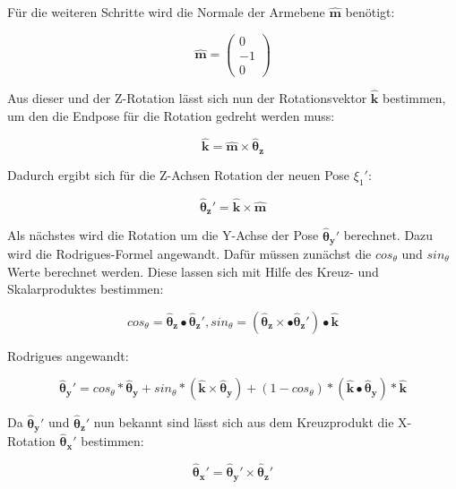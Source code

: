 Für die weiteren Schritte wird die Normale der Armebene $\pmb{\hat{m}}$ benötigt:

\begin{equation}
\pmb{\hat{m}} = 
\left(\begin{array}{c} 
0 \\
-1\\
0
\end{array}\right)
\label{eq:21}
\end{equation}

Aus dieser und der Z-Rotation lässt sich nun der Rotationsvektor $\pmb{\hat{k}}$ bestimmen, um den die Endpose für die Rotation gedreht werden muss:

\begin{equation}
\pmb{\hat{k}} = \pmb{\hat{m}} \times \pmb{\hat{\theta}_z} 
\label{eq:22}
\end{equation}

Dadurch ergibt sich für die Z-Achsen Rotation der neuen Pose $\xi_1'$:

\begin{equation}
\pmb{\hat{\theta}_z'} = \pmb{\hat{k}} \times \pmb{\hat{m}}
\label{eq:23}
\end{equation}

Als nächstes wird die Rotation um die Y-Achse der Pose $\pmb{\hat{\theta}_y'}$ berechnet. Dazu wird die Rodrigues-Formel angewandt. Dafür müssen zunächst die $cos_\theta$ und $sin_\theta$ Werte berechnet werden. Diese lassen sich mit Hilfe des Kreuz- und Skalarproduktes bestimmen:

\begin{equation}
cos_\theta = \pmb{\hat{\theta}_z} \bullet \pmb{\hat{\theta}_z'}, sin_\theta = (\pmb{\hat{\theta}_z} \times \bullet \pmb{\hat{\theta}_z'}) \bullet \pmb{\hat{k}}
\label{eq:24}
\end{equation}

Rodrigues angewandt:

\begin{equation}
\pmb{\hat{\theta}_y'} = cos_\theta * \pmb{\hat{\theta}_y} + sin_\theta * ( \pmb{\hat{k}} \times \pmb{\hat{\theta}_y}) + (1 - cos_\theta) * (\pmb{\hat{k}} \bullet \pmb{\hat{\theta}_y}) * \pmb{\hat{k}} 
\label{eq:25}
\end{equation}

Da $\pmb{\hat{\theta}_y'}$ und $\pmb{\hat{\theta}_z'} $ nun bekannt sind lässt sich aus dem Kreuzprodukt die X-Rotation $\pmb{\hat{\theta}_x'} $ bestimmen:

\begin{equation}
\pmb{\hat{\theta}_x'} = \pmb{\hat{\theta}_y'} \times \pmb{\hat{\theta}_z'}
\label{eq:26}
\end{equation}

